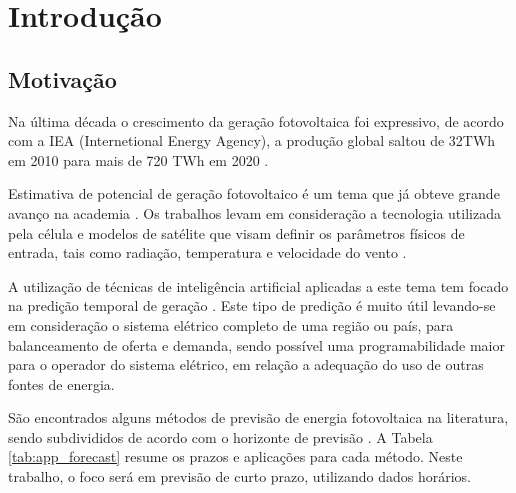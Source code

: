 \chapter{Introdução}
\label{cap:introducao}

\section{Motivação}

Na última década o crescimento da geração fotovoltaica foi expressivo, de acordo com a IEA (Internetional Energy Agency), a produção global saltou de 32TWh em 2010 para mais de 720 TWh em 2020 \cite{ieasolarpvontrack2020}. 

Estimativa de potencial de geração fotovoltaico é um tema que já obteve grande avanço na academia \cite{chin2015cell, jordehi2016parameter, de2017performance}. Os trabalhos levam em consideração a tecnologia utilizada pela célula e modelos de satélite que visam definir os parâmetros físicos de entrada, tais como radiação, temperatura e velocidade do vento \cite{mueller2009cm, huld2012new, amillo2014new, habte2017evaluation}.

A utilização de técnicas de inteligência artificial aplicadas a este tema tem focado na predição temporal de geração \cite{voyant2017machine, wolff2016statistical, li2016hierarchical}. Este tipo de predição é muito útil levando-se em consideração o sistema elétrico completo de uma região ou país, para balanceamento de oferta e demanda, sendo possível uma programabilidade maior para o operador do sistema elétrico, em relação a adequação do uso de outras fontes de energia.

São encontrados alguns métodos de previsão de energia fotovoltaica na literatura, sendo subdivididos de acordo com o horizonte de previsão \cite{mellit2020advanced}. A Tabela \ref{tab:app_forecast} resume os prazos e aplicações para cada método. Neste trabalho, o foco será em previsão de curto prazo, utilizando dados horários.

